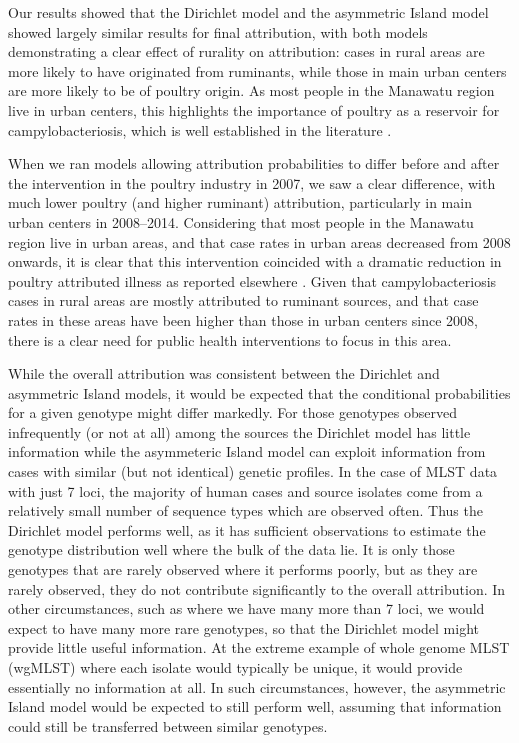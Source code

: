 \documentclass[AMA,STIX1COL]{WileyNJD-v2}
\begin{document}
Our results showed that the Dirichlet model and the asymmetric Island model showed largely similar results for final attribution, with both models demonstrating a clear effect of rurality on attribution: cases in rural areas are more likely to have originated from ruminants, while those in main urban centers are more likely to be of poultry origin. As most people in the Manawatu region live in urban centers, this highlights the importance of poultry as a reservoir for campylobacteriosis, which is well established in the literature \cite{MullA, Marsh, MullM, Leve}.

When we ran models allowing attribution probabilities to differ before and after the intervention in the poultry industry in 2007, we saw a clear difference, with much lower poultry (and higher ruminant) attribution, particularly in main urban centers in 2008--2014. Considering that most people in the Manawatu region live in urban areas, and that case rates in urban areas decreased from 2008 onwards, it is clear that this intervention coincided with a dramatic reduction in poultry attributed illness as reported elsewhere \cite{AnnS}. Given that campylobacteriosis cases in rural areas are mostly attributed to ruminant sources, and that case rates in these areas have been higher than those in urban centers since 2008, there is a clear need for public health interventions to focus in this area.

While the overall attribution was consistent between the Dirichlet and asymmetric Island models, it would be expected that the conditional probabilities for a given genotype might differ markedly. For those genotypes observed infrequently (or not at all) among the sources the Dirichlet model has little information while the asymmeteric Island model can exploit information from cases with similar (but not identical) genetic profiles. In the case of MLST data with just 7 loci, the majority of human cases and source isolates come from a relatively small number of sequence types which are observed often. Thus the Dirichlet model performs well, as it has sufficient observations to estimate the genotype distribution well where the bulk of the data lie. It is only those genotypes that are rarely observed where it performs poorly, but as they are rarely observed, they do not contribute significantly to the overall attribution. In other circumstances, such as where we have many more than 7 loci, we would expect to have many more rare genotypes, so that the Dirichlet model might provide little useful information. At the extreme example of whole genome MLST (wgMLST) where each isolate would typically be unique, it would provide essentially no information at all. In such circumstances, however, the asymmetric Island model would be expected to still perform well, assuming that information could still be transferred between similar genotypes.
\end{document}
